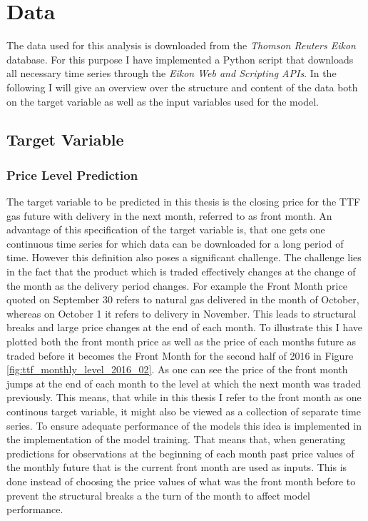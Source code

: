 \chapter{Data}\label{Sec:Data}
The data used for this analysis is downloaded from the \textit{Thomson Reuters Eikon} database. For this purpose I have implemented a Python script that downloads all necessary time series through the \textit{Eikon Web and Scripting APIs}. In the following I will give an overview over the structure and content of the data both on the target variable as well as the input variables used for the model. 
\section{Target Variable}
\subsection{Price Level Prediction}
The target variable to be predicted in this thesis is the closing price for the TTF gas future with delivery in the next month, referred to as front month. An advantage of this specification of the target variable is, that one gets one continuous time series for which data can be downloaded for a long period of time. However this definition also poses a significant challenge. The challenge lies in the fact that the product which is traded effectively changes at the change of the month as the delivery period changes. For example the Front Month price quoted on September 30 refers to natural gas delivered in the month of October, whereas on October 1 it refers to delivery in November. This leads to structural breaks and large price changes at the end of each month. To illustrate this I have plotted both the front month price as well as the price of each months future as traded before it becomes the Front Month for the second half of 2016 in Figure \ref{fig:ttf_monthly_level_2016_02}. As one can see the price of the front month jumps at the end of each month to the level at which the next month was traded previously.  This means, that while in this thesis I refer to the front month as one continous target variable, it might also be viewed as a collection of separate time series. To ensure adequate performance of the models this idea is implemented in the implementation of the model training. That means that, when generating predictions for observations at the beginning of each month past price values of the monthly future that is the current front month are used as inputs. This is done instead of choosing the price values of what was the front month before to prevent the structural breaks a the turn of the month to affect model performance.  

